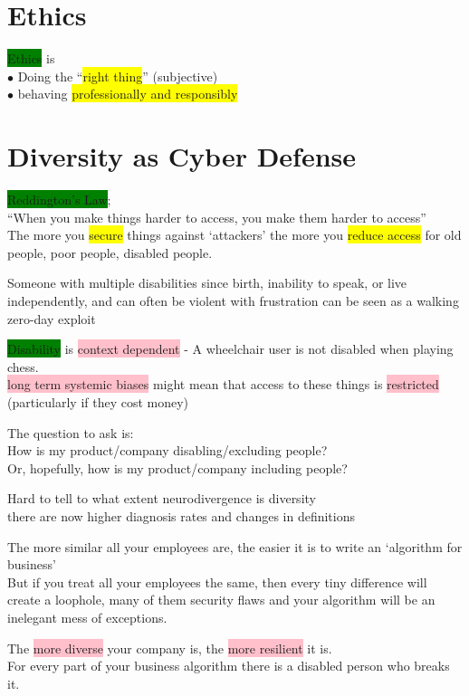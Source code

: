 \documentclass[tikz,border=10pt]{project_plan}
\newcommand{\bulletPoint}{\hspace{-3.1pt}$\bullet$ \hspace{5pt}}
\begin{document}
\section{Ethics}

\colorbox{green}{Ethics} is\\
\bulletPoint Doing the “\colorbox{yellow}{right thing}” (subjective)\\
\bulletPoint behaving \colorbox{yellow}{professionally and responsibly}

\section{Diversity as Cyber Defense}

\colorbox{green}{Reddington’s Law};\\
“When you make things harder to access, you make them harder to access”\\
The more you \colorbox{yellow}{secure} things against ‘attackers’ the more you \colorbox{yellow}{reduce access} for
old people, poor people, disabled people.

Someone with multiple disabilities since birth, inability to speak, or
live independently, and can often be violent with frustration can be seen as a
walking zero-day exploit

\colorbox{green}{Disability} is \colorbox{pink}{context dependent} -  A wheelchair user is not disabled when playing chess. \\
\colorbox{pink}{long term systemic biases} might mean that access to these things is \colorbox{pink}{restricted}\\
(particularly if they cost money)

The question to ask is: \\
How is my product/company disabling/excluding people? \\
Or, hopefully, how is my product/company including people?

Hard to tell to what extent neurodivergence is diversity\\
there are now higher diagnosis rates and changes in definitions

The more similar all your employees are, the easier it is to write an ‘algorithm for business’\\
But if you treat all your employees the same, then every tiny difference will create a loophole,
many of them security flaws and your algorithm will be an inelegant mess of exceptions.

The \colorbox{pink}{more diverse} your company is, the \colorbox{pink}{more resilient} it is.\\
For every part of your business algorithm there is a disabled person who breaks it.
\end{document}
